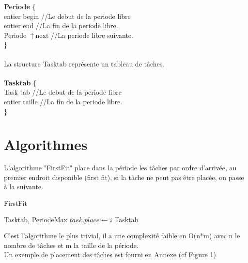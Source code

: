 \documentclass[11pt]{article}
\begin{document}
\indent \textbf{Periode} \{ \\
    \indent \indent entier begin    \indent \indent//Le debut de la periode libre\\
    \indent \indent entier end \indent \indent //La fin de la periode libre.\\
    \indent \indent Periode $\uparrow$next \indent //La periode libre suivante.\\
\indent\}
\\\\
La structure Tasktab représente un tableau de tâches.\\\\
\indent \textbf{Tasktab} \{ \\
    \indent \indent Task tab    \indent \indent//Le debut de la periode libre\\
    \indent \indent entier taille \indent   //La fin de la periode libre.\\
\indent\}

\section{Algorithmes}

L'algorithme "FirstFit" place dans la période les tâches par ordre d'arrivée, au premier endroit disponible (first fit), si la tâche ne peut pas être placée, on passe à la suivante.
\begin{algorithm}
    \caption{FirstFit}
    \begin{algorithmic}
    \REQUIRE Tasktab, PeriodeMax
            \STATE $task.place \leftarrow i$
         \ENDIF
        \ENDFOR
    \ENDFOR
    \RETURN Tasktab
    \end{algorithmic}
\end{algorithm}

C'est l'algorithme le plus trivial, il a une complexité faible en O(n*m) avec n le nombre de tâches et m la taille de la période.\\
Un exemple de placement des tâches est fourni en Annexe (cf Figure 1)\\
\end{document}
